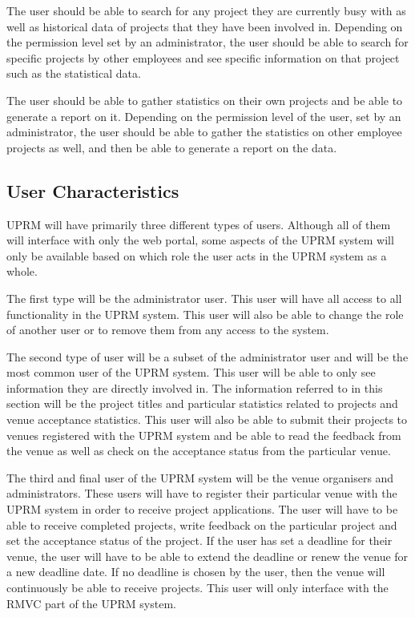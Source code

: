 		The user should be able to search for any project they are currently busy with as well as historical data of projects that they have been involved in. Depending on the permission level set by an administrator, the user should be able to search for specific projects by other employees and see specific information on that project such as the statistical data.
		
		The user should be able to gather statistics on their own projects and be able to generate a report on it. Depending on the permission level of the user, set by an administrator, the user should be able to gather the statistics on other employee projects as well, and then be able to generate a report on the data.
	
	\subsection{User Characteristics}
		UPRM will have primarily three different types of users. Although all of them will interface with only the web portal, some aspects of the UPRM system will only be available based on which role the user acts in the UPRM system as a whole.
		
		The first type will be the administrator user. This user will have all access to all functionality in the UPRM system. This user will also be able to change the role of another user or to remove them from any access to the system.
		
		The second type of user will be a subset of the administrator user and will be the most common user of the UPRM system. This user will be able to only see information they are directly involved in. The information referred to in this section will be the project titles and particular statistics related to projects and venue acceptance statistics. This user will also be able to submit their projects to venues registered with the UPRM system and be able to read the feedback from the venue as well as check on the acceptance status from the particular venue.
		
		The third and final user of the UPRM system will be the venue organisers and administrators. These users will have to register their particular venue with the UPRM system in order to receive project applications. The user will have to be able to receive completed projects, write feedback on the particular project and set the acceptance status of the project. If the user has set a deadline for their venue, the user will have to be able to extend the deadline or renew the venue for a new deadline date. If no deadline is chosen by the user, then the venue will continuously be able to receive projects. This user will only interface with the RMVC part of the UPRM system.
	

